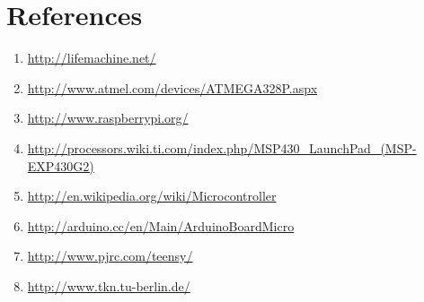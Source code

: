 \documentclass[12pt]{article} %
\begin{document}
\section*{References} %
\begin{enumerate}
\item \url{http://lifemachine.net/}
\item \url{http://www.atmel.com/devices/ATMEGA328P.aspx}
\item \url{http://www.raspberrypi.org/}
\item \url{http://processors.wiki.ti.com/index.php/MSP430_LaunchPad_(MSP-EXP430G2)}
\item \url{http://en.wikipedia.org/wiki/Microcontroller}
\item \url{http://arduino.cc/en/Main/ArduinoBoardMicro}
\item \url{http://www.pjrc.com/teensy/}
\item \url{http://www.tkn.tu-berlin.de/}
\end{enumerate}
\end{document}
